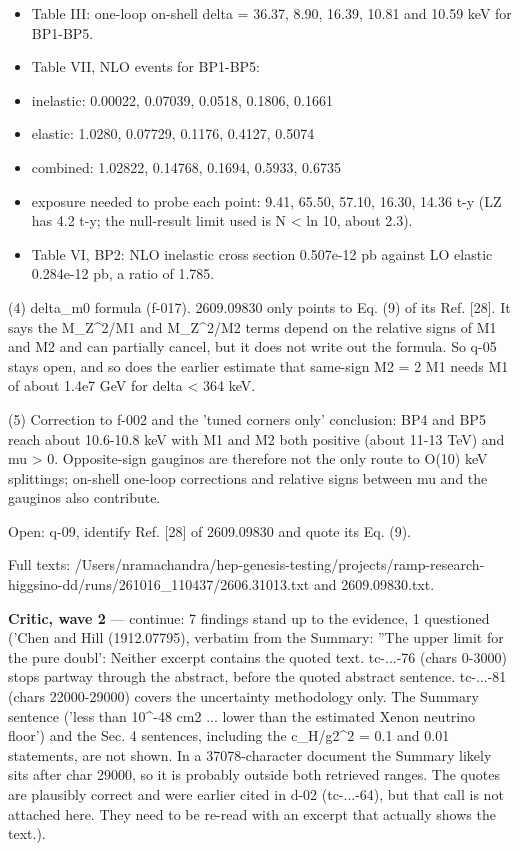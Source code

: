 \documentclass[11pt,a4paper]{article}
\begin{document}
\begin{itemize}
  \item Table III: one-loop on-shell delta = 36.37, 8.90, 16.39, 10.81 and 10.59 keV for BP1-BP5.
  \item Table VII, NLO events for BP1-BP5:
  \item inelastic: 0.00022, 0.07039, 0.0518, 0.1806, 0.1661
  \item elastic: 1.0280, 0.07729, 0.1176, 0.4127, 0.5074
  \item combined: 1.02822, 0.14768, 0.1694, 0.5933, 0.6735
  \item exposure needed to probe each point: 9.41, 65.50, 57.10, 16.30, 14.36 t-y (LZ has 4.2 t-y; the null-result limit used is N \textless{} ln 10, about 2.3).
  \item Table VI, BP2: NLO inelastic cross section 0.507e-12 pb against LO elastic 0.284e-12 pb, a ratio of 1.785.
\end{itemize}
(4) delta\_m0 formula (f-017). 2609.09830 only points to Eq. (9) of its Ref. [28]. It says the M\_Z\textasciicircum{}2/M1 and M\_Z\textasciicircum{}2/M2 terms depend on the relative signs of M1 and M2 and can partially cancel, but it does not write out the formula. So q-05 stays open, and so does the earlier estimate that same-sign M2 = 2 M1 needs M1 of about 1.4e7 GeV for delta \textless{} 364 keV.

(5) Correction to f-002 and the 'tuned corners only' conclusion: BP4 and BP5 reach about 10.6-10.8 keV with M1 and M2 both positive (about 11-13 TeV) and mu \textgreater{} 0. Opposite-sign gauginos are therefore not the only route to O(10) keV splittings; on-shell one-loop corrections and relative signs between mu and the gauginos also contribute.

Open: q-09, identify Ref. [28] of 2609.09830 and quote its Eq. (9).

Full texts: /Users/nramachandra/hep-genesis-testing/projects/ramp-research-higgsino-dd/runs/261016\_110437/2606.31013.txt and 2609.09830.txt.

\textbf{Critic, wave 2} --- continue: 7 findings stand up to the evidence, 1 questioned ('Chen and Hill (1912.07795), verbatim from the Summary: ''The upper limit for the pure doubl': Neither excerpt contains the quoted text. tc-...-76 (chars 0-3000) stops partway through the abstract, before the quoted abstract sentence. tc-...-81 (chars 22000-29000) covers the uncertainty methodology only. The Summary sentence ('less than 10\textasciicircum{}-48 cm2 ... lower than the estimated Xenon neutrino floor') and the Sec. 4 sentences, including the c\_H/g2\textasciicircum{}2 = 0.1 and 0.01 statements, are not shown. In a 37078-character document the Summary likely sits after char 29000, so it is probably outside both retrieved ranges. The quotes are plausibly correct and were earlier cited in d-02 (tc-...-64), but that call is not attached here. They need to be re-read with an excerpt that actually shows the text.).
\end{document}
